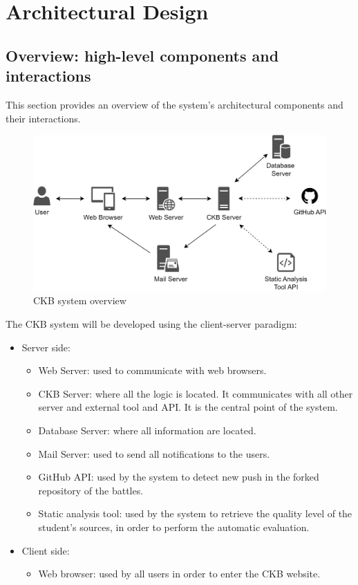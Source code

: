 \chapter{Architectural Design}
\section{Overview: high-level components and interactions}
This section provides an overview of the system's architectural components and their interactions.

\begin{figure}[h]
    \centering
    \includegraphics[scale=0.5]{images/hl-system.png}
    \caption{CKB system overview}
    \label{fig:CKBoverview}
\end{figure}

The CKB system will be developed using the client-server paradigm:
\begin{itemize}
    \item Server side:
    \begin{itemize}
        \item Web Server: used to communicate with web browsers.
        \item CKB Server: where all the logic is located. It communicates with all other server and external tool and API. It is the central point of the system.
        \item Database Server: where all information are located.
        \item Mail Server: used to send all notifications to the users.
        \item GitHub API: used by the system to detect new push in the forked repository of the battles.
        \item Static analysis tool: used by the system to retrieve the quality level of the student's sources, in order to perform the automatic evaluation. 
    \end{itemize}
    \item Client side:
    \begin{itemize}
        \item Web browser: used by all users in order to enter the CKB website.
    \end{itemize}
\end{itemize}

